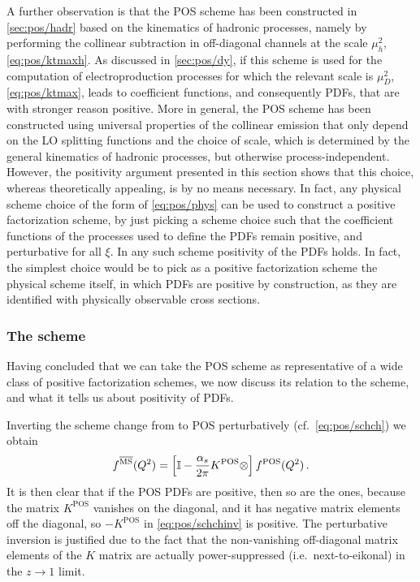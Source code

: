 A further observation is that the POS
scheme has been constructed in \cref{sec:pos/hadr} based on the kinematics of hadronic processes,
namely by performing the collinear subtraction in off-diagonal
channels at the scale  $\mu_h^2$,
\cref{eq:pos/ktmaxh}. As discussed in \cref{sec:pos/dy}, if this
scheme is used for the computation of electroproduction processes for
which the relevant scale is $\mu_D^2$, \cref{eq:pos/ktmax}, leads
to coefficient functions, and consequently PDFs, that are with stronger
reason positive. More in general, the POS scheme has been constructed
using universal properties of the collinear emission that only
depend on the LO splitting functions and the choice of scale, which is
determined by the general kinematics of hadronic processes, but
otherwise process-independent. However, the positivity argument
presented in this section shows that this choice, whereas theoretically
appealing, is by no means necessary. In fact, any physical scheme
choice of the form of \cref{eq:pos/phys} can be used to construct a
positive factorization scheme, by just picking a scheme choice such
that the coefficient functions of the processes used to define the
PDFs remain positive, and perturbative for all $\xi$.
In any such scheme positivity of the PDFs
holds. In fact, the simplest choice would be to pick as a
positive factorization scheme the physical scheme itself, in which
PDFs are positive by construction, as they are identified with
physically observable cross sections.

\subsubsection{The \msbar{} scheme}
\label{sec:pos/posmsbar}


Having concluded that we can take the POS scheme as representative of
a wide class of positive factorization schemes, we now discuss 
its relation to the \msbar{} scheme, and what it
tells us about positivity of \msbar{} PDFs.

Inverting the scheme change from \msbar{} to POS perturbatively (cf.\ \cref{eq:pos/schch})
we obtain
\begin{equation}
  \label{eq:pos/schchinv}
 f^{{\overline{\textrm{MS}}}}(Q^2)=\left[\mathbb{I}
  -\frac{\alpha_s}{2\pi}  K^{\textrm{POS}}\otimes \right]  f^{\textrm{POS}}(Q^2) \,.
\end{equation}
It is then clear that if the POS PDFs are positive, then so are the
\msbar{} ones, because the matrix $K^{\textrm{POS}}$ vanishes on the
diagonal, and it has negative matrix elements off the diagonal, so
$-K^{\textrm{POS}}$ in \cref{eq:pos/schchinv} is positive.
The perturbative inversion is justified due to the fact that the
non-vanishing off-diagonal matrix elements of the $K$ matrix are
actually power-suppressed (i.e.\ next-to-eikonal) in the $z\to 1$
limit.

